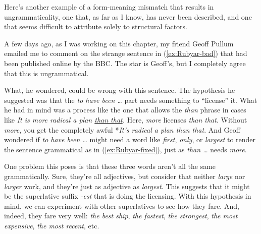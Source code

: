 Here's another example of a form-meaning mismatch that results in ungrammaticality, one that, as far as I know, has never been described, and one that seems difficult to attribute solely to structural factors.

A few days ago, as I was working on this chapter, my friend Geoff Pullum emailed me to comment on the strange sentence in (\ref{ex:Rubyar-bad}) that had been published online by the BBC. The star is Geoff's, but I completely agree that this is ungrammatical. 

\label{ex:Rubyar-bad}
\z

What, he wondered, could be wrong with this sentence. The hypothesis he suggested was that the \textit{to have been \dots} part needs something to ``license'' it. What he had in mind was a process like the one that allows the \textit{than} phrase in cases like \textit{It is more radical a plan \uline{than that}.} Here, \textit{more} licenses \textit{than that}. Without \textit{more}, you get the completely awful *\textit{It's radical a plan than that}. And Geoff wondered if \textit{to have been \dots} might need a word like \textit{first}, \textit{only}, or \textit{largest} to render the sentence grammatical as in (\ref{ex:Rubyar-fixed}), just as \textit{than \dots} needs \textit{more}.

\ea \label{ex:Rubyar-fixed}
    \z
\z

One problem this poses is that these three words aren't all the same grammatically. Sure, they're all adjectives, but consider that neither \textit{large} nor \textit{larger} work, and they're just as adjective as \textit{largest}. This suggests that it might be the superlative suffix \textit{-est} that is doing the licensing. With this hypothesis in mind, we can experiment with other superlatives to see how they fare. And, indeed, they fare very well: \textit{the best ship}, \textit{the fastest}, \textit{the strongest}, \textit{the most expensive}, \textit{the most recent}, etc.


